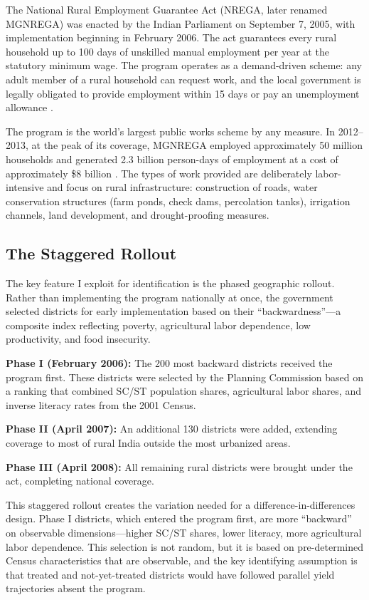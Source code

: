 \documentclass[12pt]{article}
\begin{document}
The National Rural Employment Guarantee Act (NREGA, later renamed MGNREGA) was enacted by the Indian Parliament on September 7, 2005, with implementation beginning in February 2006. The act guarantees every rural household up to 100 days of unskilled manual employment per year at the statutory minimum wage. The program operates as a demand-driven scheme: any adult member of a rural household can request work, and the local government is legally obligated to provide employment within 15 days or pay an unemployment allowance \citep{imbert2015labor}.

The program is the world's largest public works scheme by any measure. In 2012--2013, at the peak of its coverage, MGNREGA employed approximately 50 million households and generated 2.3 billion person-days of employment at a cost of approximately \$8 billion \citep{sukhtankar2017sweetening}. The types of work provided are deliberately labor-intensive and focus on rural infrastructure: construction of roads, water conservation structures (farm ponds, check dams, percolation tanks), irrigation channels, land development, and drought-proofing measures.

\subsection{The Staggered Rollout}

The key feature I exploit for identification is the phased geographic rollout. Rather than implementing the program nationally at once, the government selected districts for early implementation based on their ``backwardness''---a composite index reflecting poverty, agricultural labor dependence, low productivity, and food insecurity.

\textbf{Phase I (February 2006):} The 200 most backward districts received the program first. These districts were selected by the Planning Commission based on a ranking that combined SC/ST population shares, agricultural labor shares, and inverse literacy rates from the 2001 Census.

\textbf{Phase II (April 2007):} An additional 130 districts were added, extending coverage to most of rural India outside the most urbanized areas.

\textbf{Phase III (April 2008):} All remaining rural districts were brought under the act, completing national coverage.

This staggered rollout creates the variation needed for a difference-in-differences design. Phase I districts, which entered the program first, are more ``backward'' on observable dimensions---higher SC/ST shares, lower literacy, more agricultural labor dependence. This selection is not random, but it is based on pre-determined Census characteristics that are observable, and the key identifying assumption is that treated and not-yet-treated districts would have followed parallel yield trajectories absent the program.
\end{document}

